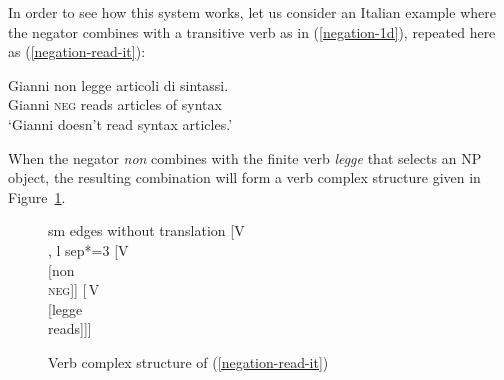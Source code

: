 \documentclass[output=paper
	        ,collection
	        ,collectionchapter
 	        ,biblatex
                ,babelshorthands
                ,newtxmath
                ,draftmode
                ,colorlinks, citecolor=brown
]{langscibook}
\begin{document}
{\begin{exe}
\begin{xlist}
In order to see how
this system works, let us consider an Italian example where
the negator combines with a transitive verb as in (\ref{negation-1d}),
repeated here as (\ref{negation-read-it}):

\begin{exe}
\ex
\label{negation-read-it}
\gll Gianni non legge articoli di sintassi.\\
Gianni \textsc{neg} reads articles of syntax\\
\glt `Gianni doesn't read syntax articles.'
\end{exe}

\noindent
When the negator \textit{non} combines with the finite verb \textit{legge} that
selects an NP object, the resulting combination will form
a verb complex structure given in Figure~\ref{negation-read-it-st}.

\begin{figure}
	\begin{forest}
sm edges without translation
		[V\\
		, l sep*=3
			[V\\
				[non\\ \textsc{neg}]]
			[\,V\\
					[legge\\ reads]]]
	\end{forest}
\caption{Verb complex structure of (\ref{negation-read-it})}\label{negation-read-it-st}
\end{figure}




\end{xlist}
\end{exe}}
\end{document}
